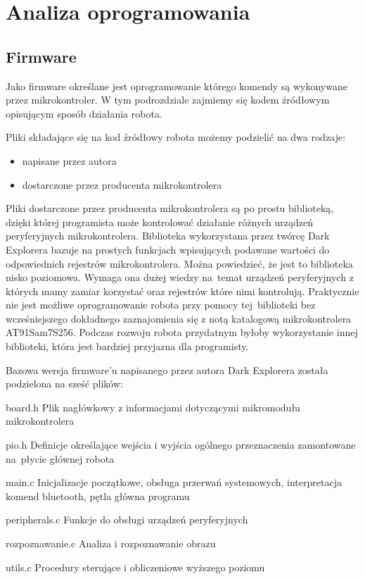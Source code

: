 \section{Analiza oprogramowania}
\subsection{Firmware}
Jako firmware określane jest oprogramowanie którego komendy są wykonywane przez
mikrokontroler. W tym podrozdziale zajmiemy się kodem źródłowym opisującym sposób
działania robota.

Pliki składające się na kod źródłowy robota możemy podzielić na dwa rodzaje:
\begin{itemize}
 \item napisane przez autora
 \item dostarczone przez producenta mikrokontrolera
\end{itemize}

Pliki dostarczone przez producenta mikrokontrolera są po prostu biblioteką,
dzięki której programista może kontrolować działanie różnych urządzeń
peryferyjnych mikrokontrolera. Biblioteka wykorzystana przez twórcę Dark
Explorera bazuje na prostych funkcjach wpisujących podawane wartości do
odpowiednich rejestrów mikrokontrolera. Można powiedzieć, że jest to biblioteka
nisko poziomowa. Wymaga ona dużej wiedzy na~temat urządzeń peryferyjnych z
których mamy zamiar korzystać oraz rejestrów które nimi kontrolują. Praktycznie
nie jest możliwe oprogramowanie robota przy pomocy tej~biblioteki bez
wcześniejszego dokładnego zaznajomienia się z notą katalogową mikrokontrolera
AT91Sam7S256. Podczas rozwoju robota przydatnym byłoby wykorzystanie innej
biblioteki, która jest bardziej przyjazna dla programisty.

Bazowa wersja firmware'u napisanego przez autora Dark Explorera została podzielona na sześć plików:
\begin{basedescript}{\desclabelstyle{\pushlabel}\desclabelwidth{40mm}}
\setlength{\parsep}{0pt}
\setlength{\itemsep}{0mm}
\setlength{\parskip}{0pt}
\item[board.h]
	Plik nagłówkowy z informacjami dotyczącymi mikromodułu mikrokontrolera
\item[pio.h] 
	Definicje określające wejścia i wyjścia ogólnego przeznaczenia zamontowane na~płycie głównej robota
\item[main.c] 
	Inicjalizacje początkowe, obsługa przerwań systemowych, interpretacja komend bluetooth, pętla główna programu
\item[peripherals.c] 
	Funkcje do obsługi urządzeń peryferyjnych
\item[rozpoznawanie.c] 
	Analiza i rozpoznawanie obrazu
\item[utils.c] 
	Procedury sterujące i obliczeniowe wyższego poziomu
\end{basedescript}

